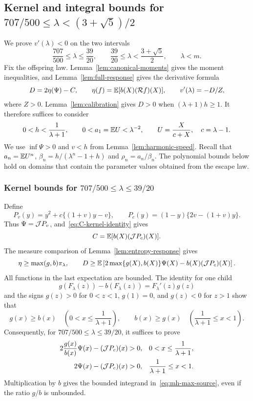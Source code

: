 \subsection{Kernel and integral bounds for \texorpdfstring{$707/500\le\lambda<(3+\sqrt5)/2$}{707/500 <= lambda < (3+sqrt(5))/2}}\label{sec:middle-high}

We prove $v'(\lambda)<0$ on the two intervals
\[
 \frac{707}{500}\le\lambda\le\frac{39}{20},
 \qquad
 \frac{39}{20}\le\lambda<\frac{3+\sqrt5}{2},
 \qquad \lambda<m.
\]
Fix the offspring law. Lemma~\ref{lem:canonical-moments} gives the moment inequalities, and Lemma~\ref{lem:full-response} gives the derivative formula
\[
 D=2\eta(\Psi)-C,\qquad
 \eta(f)=\mathbb E[b(X)(\mathcal Rf)(X)],\qquad v'(\lambda)=-D/Z,
\]
where $Z>0$. Lemma~\ref{lem:calibration} gives $D>0$ when $(\lambda+1)h\ge1$. It therefore suffices to consider
\begin{equation}\label{eq:mh-hard}
 0<h<\frac1{\lambda+1},\qquad
 0<a_1=\mathbb E U<\lambda^{-2},\qquad U=\frac{X}{c+X},\quad c=\lambda-1.
\end{equation}
We use $\inf\Psi>0$ and $v<h$ from Lemma~\ref{lem:harmonic-speed}. Recall that $a_n=\mathbb E U^n$, $\beta_n=h/(\lambda^n-1+h)$ and $\rho_n=a_n/\beta_n$. The polynomial bounds below hold on domains that contain the parameter values obtained from the escape law.

\subsubsection{Kernel bounds for \texorpdfstring{$707/500\le\lambda\le39/20$}{707/500 <= lambda <= 39/20}}
Define
\[
 P_v(y)=y^2+c\{(1+v)y-v\},\qquad
 P_c(y)=(1-y)\{2v-(1+v)y\}.
\]
Thus $\Psi=\mathcal J P_v$, and~\eqref{eq:C-kernel-identity} gives
\begin{equation}\label{eq:mh-C-kernel}
 C=\mathbb E[b(X)(\mathcal J P_c)(X)].
\end{equation}
The measure comparison of Lemma~\ref{lem:entropy-response} gives
\begin{equation}\label{eq:mh-max-source}
 \eta\ge\max(g,b)\pi_\lambda,
 \qquad
 D\ge\mathbb E\left[2\max\{g(X),b(X)\}\Psi(X)-b(X)(\mathcal J P_c)(X)\right].
\end{equation}
All functions in the last expectation are bounded. The identity for one child
\[
 g(F_\lambda(z))-b(F_\lambda(z))=F_\lambda'(z)g(z)
\]
and the signs $g(z)>0$ for $0<z<1$, $g(1)=0$, and $g(z)<0$ for $z>1$ show that
\begin{equation}\label{eq:mh-source-split}
 g(x)\ge b(x)\quad\left(0<x\le\frac1{\lambda+1}\right),
 \qquad
 b(x)\ge g(x)\quad\left(\frac1{\lambda+1}\le x<1\right).
\end{equation}
Consequently, for $707/500\le\lambda\le39/20$, it suffices to prove
\begin{align}\label{eq:mh-two-kernels}
 2\frac{g(x)}{b(x)}\Psi(x)-(\mathcal J P_c)(x)&>0,
 &&0<x\le\frac1{\lambda+1},\notag\\
 2\Psi(x)-(\mathcal J P_c)(x)&>0,
 &&\frac1{\lambda+1}\le x<1.
\end{align}
Multiplication by $b$ gives the bounded integrand in~\eqref{eq:mh-max-source}, even if the ratio $g/b$ is unbounded.

